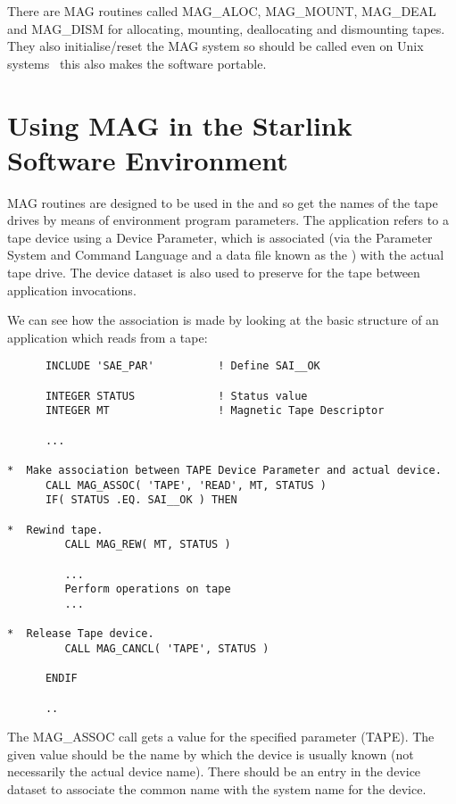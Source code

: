 There are MAG routines called MAG\_ALOC, MAG\_MOUNT, MAG\_DEAL and MAG\_DISM
for allocating, mounting, deallocating and dismounting tapes. They also
initialise/reset the MAG system so should be called even on Unix systems
\dash\ this also makes the software portable.

\section{Using MAG in the Starlink Software Environment}
MAG routines are designed to be used in the
and so get the names of the tape drives by means of environment program
parameters. The application refers to a tape device using a Device Parameter,
which is associated (via the Parameter System and Command Language and a data
file known as the
) with the actual tape drive.
The device dataset is also used to preserve
for the tape between application
invocations.

We can see how the association is made by looking at the basic structure of
an application which reads from a tape:

\small
\begin{verbatim}
      INCLUDE 'SAE_PAR'          ! Define SAI__OK

      INTEGER STATUS             ! Status value
      INTEGER MT                 ! Magnetic Tape Descriptor

      ...

*  Make association between TAPE Device Parameter and actual device.
      CALL MAG_ASSOC( 'TAPE', 'READ', MT, STATUS )
      IF( STATUS .EQ. SAI__OK ) THEN

*  Rewind tape.
         CALL MAG_REW( MT, STATUS )

         ...
         Perform operations on tape
         ...

*  Release Tape device.
         CALL MAG_CANCL( 'TAPE', STATUS )

      ENDIF

      ..
\end{verbatim}
\normalsize

The MAG\_ASSOC call gets a value for the specified parameter (TAPE).
The given value should be the name by which the device is usually known
(not necessarily the actual device name). There should be an entry in the
device dataset to associate the common name with the system name for the
device.

